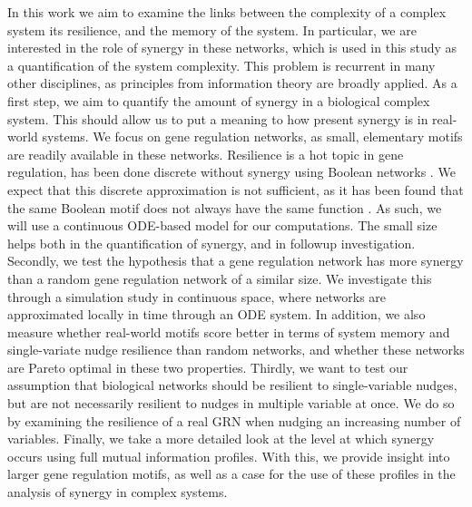 \documentclass[../main.tex]{subfiles}
\begin{document}
In this work we aim to examine the links between the complexity of a complex system its resilience, and the memory of the system.
In particular, we are interested in the role of synergy in these networks, which is used in this study as a quantification of the system complexity.
This problem is recurrent in many other disciplines, as principles from information theory are broadly applied.
As a first step, we aim to quantify the amount of synergy in a biological complex system.
This should allow us to put a meaning to how present synergy is in real-world systems.
We focus on gene regulation networks, as small, elementary motifs are readily available in these networks.
Resilience is a hot topic in gene regulation, has been done discrete without synergy using Boolean networks \cite{peixoto2012emergence}.
We expect that this discrete approximation is not sufficient, as it has been found that the same Boolean motif does not always have the same function \cite{ingram2006network}.
As such, we will use a continuous ODE-based model for our computations.
The small size helps both in the quantification of synergy, and in followup investigation.
Secondly, we test the hypothesis that a gene regulation network has more synergy than a random gene regulation network of a similar size. 
We investigate this through a simulation study in continuous space, where networks are approximated locally in time through an ODE system.
In addition, we also measure whether real-world motifs score better in terms of system memory and single-variate nudge resilience than random networks, and whether these networks are Pareto optimal in these two properties.
Thirdly, we want to test our assumption that biological networks should be resilient to single-variable nudges, but are not necessarily resilient to nudges in multiple variable at once.
We do so by examining the resilience of a real GRN when nudging an increasing number of variables.
Finally, we take a more detailed look at the level at which synergy occurs using full mutual information profiles.
With this, we provide insight into larger gene regulation motifs, as well as a case for the use of these profiles in the analysis of synergy in complex systems.
\end{document}
